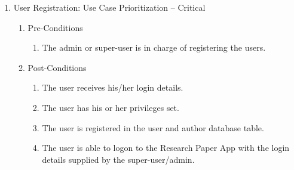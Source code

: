\documentclass[10pt,a4paper]{exam}
\begin{document}
\noindent  

\begin{enumerate}
\item  User Registration: Use Case Prioritization -- Critical

\begin{enumerate}
\item  Pre-Conditions

\begin{enumerate}
\item  The admin or super-user is in charge of registering the users.
\end{enumerate}

\item  Post-Conditions

\begin{enumerate}
\item  The user receives his/her login details.

\item  The user has his or her privileges set.

\item  The user is registered in the user and author database table.

\item  The user is able to logon to the Research Paper App with the login details supplied by the super-user/admin.
\end{enumerate}
\end{enumerate}
\end{enumerate}

\noindent  
\end{document}
